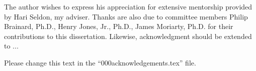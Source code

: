 The author wishes to express his appreciation for extensive mentorship provided by Hari Seldon, my adviser.
Thanks are also due to committee members Philip Brainard, Ph.D., Henry Jones, Jr., Ph.D., James Moriarty, Ph.D. for their contributions to this dissertation. 
Likewise, acknowledgment should be extended to ... 

Please change this text in the ``000acknowledgements.tex'' file.